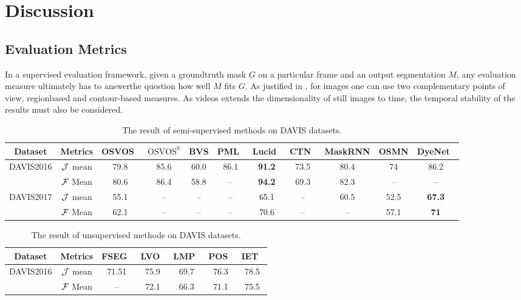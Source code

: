 \section{Discussion}

\subsection{Evaluation Metrics}
In a supervised evaluation framework, given a groundtruth mask $G$ on a particular frame and an output segmentation $M$,
any evaluation measure ultimately has to answerthe question how well $M$ fits $G$. As justified in \cite{pont2016supervised}, 
for images one can use two complementary points of view, regionbased and contour-based measures. As videos extends the
dimensionality of still images to time, the temporal stability of the results must also be considered.


\begin{table*}[ht]
	\begin{center}
		\setlength\tabcolsep{1pt}
		\begin{tabular}{|c|c|c|c|c|c|c|c|c|c|c|}
		\hline
Dataset& Metrics &OSVOS~\cite{OSVOS} &$\text{OSVOS}^\text{S}$\cite{OSVOS-S} &BVS\cite{BVS} &PML~\cite{PML} &Lucid~\cite{LucidTracker} &CTN~\cite{CTN} &MaskRNN\cite{MaskRNN} &OSMN\cite{OSMN} &DyeNet~\cite{DyeNet} \\
\hline
\multirow{2}{*}{DAVIS2016} &$\mathcal{J}$ mean  &79.8 &85.6 & 60.0 &86.1 &\textbf{91.2} &73.5 &80.4 &74 &86.2 \\
\cline{2-11}
&$\mathcal{F}$ Mean  &80.6 &86.4 &58.8 &-- &\textbf{94.2} &69.3 &82.3 &-- &-- \\
\hline
\multirow{2}{*}{DAVIS2017} &$\mathcal{J}$ mean  &55.1 &-- &-- &-- &65.1 &-- &60.5 &52.5 &\textbf{67.3} \\
\cline{2-11}
&$\mathcal{F}$ Mean &62.1 &-- &-- &-- &70.6 &-- &-- &57.1 &\textbf{71}\\
\hline
\end{tabular}
\end{center}
\caption{The result of semi-supervised methods on DAVIS datasets.}
\label{table:semisuperivsed_all_dataset}
\end{table*}


\begin{table*}[ht]
	\begin{center}
		\setlength\tabcolsep{3pt}
		\begin{tabular}{|c|c|c|c|c|c|c|}
		\hline
Dataset& Metrics &FSEG~\cite{Jain2017FusionSeg}  &LVO~\cite{Tokmakov2017Learning} &LMP~\cite{Tokmakov2017Learning} & POS~\cite{Koh2017Primary} &IET~\cite{li2018instance}\\
\hline
\multirow{2}{*}{DAVIS2016} &$\mathcal{J}$ mean  &71.51   &75.9     &69.7       &76.3    &78.5\\
\cline{2-7}
&$\mathcal{F}$ Mean      &   --    &72.1  &66.3        &71.1      &75.5\\
\hline
\end{tabular}
\end{center}
\caption{The result of unsupervised methods on DAVIS datasets.}
\label{table:unsuperivsed_all_dataset}
\end{table*}




